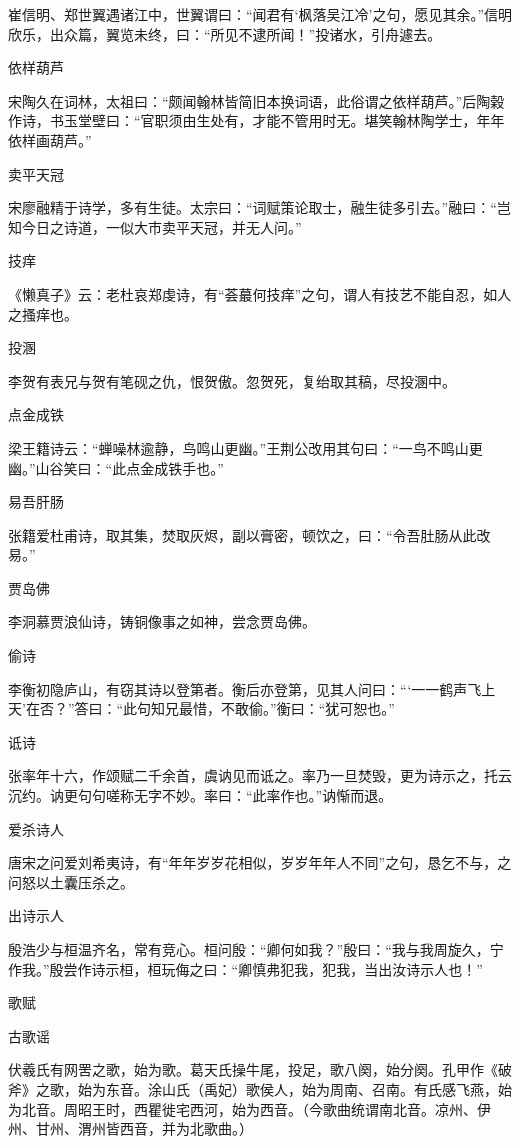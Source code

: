 \documentclass[a4paper,12pt,UTF8,twoside]{ctexbook}
\begin{document}
    崔信明、郑世翼遇诸江中，世翼谓曰：“闻君有‘枫落吴江冷’之句，愿见其余。”信明欣乐，出众篇，翼览未终，曰：“所见不逮所闻！”投诸水，引舟遽去。
    
    依样葫芦
    
    宋陶久在词林，太祖曰：“颇闻翰林皆简旧本换词语，此俗谓之依样葫芦。”后陶榖作诗，书玉堂壁曰：“官职须由生处有，才能不管用时无。堪笑翰林陶学士，年年依样画葫芦。”
    
    卖平天冠
    
    宋廖融精于诗学，多有生徒。太宗曰：“词赋策论取士，融生徒多引去。”融曰：“岂知今日之诗道，一似大市卖平天冠，并无人问。”
    
    技痒
    
    《懒真子》云：老杜哀郑虔诗，有“荟蕞何技痒”之句，谓人有技艺不能自忍，如人之搔痒也。
    
    投溷
    
    李贺有表兄与贺有笔砚之仇，恨贺傲。忽贺死，复绐取其稿，尽投溷中。
    
    点金成铁
    
    梁王籍诗云：“蝉噪林逾静，鸟鸣山更幽。”王荆公改用其句曰：“一鸟不鸣山更幽。”山谷笑曰：“此点金成铁手也。”
    
    易吾肝肠
    
    张籍爱杜甫诗，取其集，焚取灰烬，副以膏密，顿饮之，曰：“令吾肚肠从此改易。”
    
    贾岛佛
    
    李洞慕贾浪仙诗，铸铜像事之如神，尝念贾岛佛。
    
    偷诗
    
    李衡初隐庐山，有窃其诗以登第者。衡后亦登第，见其人问曰：“‘一一鹤声飞上天’在否？”答曰：“此句知兄最惜，不敢偷。”衡曰：“犹可恕也。”
    
    诋诗
    
    张率年十六，作颂赋二千余首，虞讷见而诋之。率乃一旦焚毁，更为诗示之，托云沉约。讷更句句嗟称无字不妙。率曰：“此率作也。”讷惭而退。
    
    爱杀诗人
    
    唐宋之问爱刘希夷诗，有“年年岁岁花相似，岁岁年年人不同”之句，恳乞不与，之问怒以土囊压杀之。
    
    出诗示人
    
    殷浩少与桓温齐名，常有竞心。桓问殷：“卿何如我？”殷曰：“我与我周旋久，宁作我。”殷尝作诗示桓，桓玩侮之曰：“卿慎弗犯我，犯我，当出汝诗示人也！”
    
    歌赋
    
    古歌谣
    
    伏羲氏有网罟之歌，始为歌。葛天氏操牛尾，投足，歌八阕，始分阕。孔甲作《破斧》之歌，始为东音。涂山氏（禹妃）歌侯人，始为周南、召南。有氏感飞燕，始为北音。周昭王时，西瞿徙宅西河，始为西音。（今歌曲统谓南北音。凉州、伊州、甘州、渭州皆西音，并为北歌曲。）
    
\end{document}
